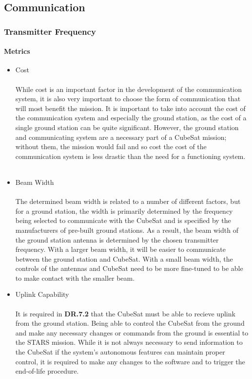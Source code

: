
\subsection{Communication}
\subsubsection{Transmitter Frequency}
\paragraph{Metrics}
\begin{itemize}
    \item Cost \\
    \\
While cost is an important factor in the development of the communication system, it is also very important to choose the form of communication that will most benefit the mission. It is important to take into account the cost of the communication system and especially the ground station, as the cost of a single ground station can be quite significant. However, the ground station and communicating system are a necessary part of a CubeSat mission; without them, the mission would fail and so cost the cost of the communication system is less drastic than the need for a functioning system. ~\\
    \item Beam Width \\
    \\
The determined beam width is related to a number of different factors, but for a ground station, the width is primarily determined by the frequency being selected to communicate with the CubeSat and is specified by the manufacturers of pre-built ground stations. As a result, the beam width of the ground station antenna is determined by the chosen transmitter frequency. With a larger beam width, it will be easier to communicate between the ground station and CubeSat. With a small beam width, the controls of the antennas and CubeSat need to be more fine-tuned to be able to make contact with the smaller beam. ~\\
    \item Uplink Capability \\
    \\
It is required in \textbf{DR.7.2} that the CubeSat must be able to recieve uplink from the ground station. Being able to control the CubeSat from the ground and make any necessary changes or commands from the ground is essential to the STARS mission. While it is not always necessary to send information to the CubeSat if the system’s autonomous features can maintain proper control, it is required to make any changes to the software and to trigger the end-of-life procedure. ~\\

\end{itemize}
